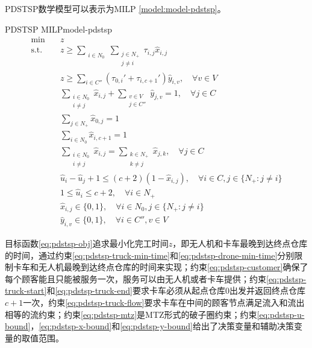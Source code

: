 PDSTSP数学模型可以表示为MILP \ref{model:model-pdstsp}。

{
\newcommand{\mySubstack}[1]{\mathclap{\substack{#1}}}

\begin{model}{PDSTSP MILP}{model-pdstsp}
\begin{align}
    \min \quad & z \label{eq:pdstsp-obj}\\
    \text{s.t.} \quad & z \geq \sum_{\substack{i \in N_0}} \sum_{\substack{j \in N_{+}\\ j\neq i}}\tau_{i,j}\hat{x}_{i,j} \label{eq:pdstsp-truck-min-time}\\
    \quad & z \geq \sum_{i \in C''}(\tau_{0,i}' + \tau_{i, c+1}')\hat{y}_{i,v},\quad \forall v \in V\label{eq:pdstsp-drone-min-time}\\
    \quad & \sum_{\substack{i \in N_0\\ i\neq j}}\hat{x}_{i,j} + \sum_{\substack{v \in V\\ j \in C''}}\hat{y}_{j,v} = 1, \quad \forall j \in C\label{eq:pdstsp-customer}\\
    \quad & \sum_{j \in N_{+}}\hat{x}_{0,j} = 1\label{eq:pdstsp-truck-start}\\
    \quad & \sum_{i \in N_0}\hat{x}_{i,c+1} = 1\label{eq:pdstsp-truck-end}\\
    \quad & \sum_{\substack{i \in N_0\\i \neq j}}\hat{x}_{i,j} = \sum_{\substack{k \in N_{+}\\ k\neq j}}\hat{x}_{j,k}, \quad \forall j \in C\label{eq:pdstsp-truck-flow}\\
    \quad & \hat{u}_i - \hat{u}_j + 1 \leq (c+2)(1 - \hat{x}_{i,j}), \quad \forall i \in C, j \in \{N_{+}:j \neq i\}\label{eq:pdstsp-mtz}\\
    \quad & 1 \leq \hat{u}_i \leq c+2, \quad \forall i \in N_{+}\label{eq:pdstsp-u-bound}\\
    \quad & \hat{x}_{i,j} \in \{0,1\},\quad \forall i \in N_0, j \in \{N_{+}: j\neq i\}\label{eq:pdstsp-x-bound}\\
    \quad & \hat{y}_{i,v} \in \{0,1\},\quad \forall i \in C'', v \in V\label{eq:pdstsp-y-bound}
\end{align}
\end{model}
}

目标函数\ref{eq:pdstsp-obj}追求最小化完工时间$z$，即无人机和卡车最晚到达终点仓库的时间，通过约束\ref{eq:pdstsp-truck-min-time}和\ref{eq:pdstsp-drone-min-time}分别限制卡车和无人机最晚到达终点仓库的时间来实现；约束\ref{eq:pdstsp-customer}确保了每个顾客能且只能被服务一次，服务可以由无人机或者卡车提供；约束\ref{eq:pdstsp-truck-start}和\ref{eq:pdstsp-truck-end}要求卡车必须从起点仓库$0$出发并返回终点仓库$c+1$一次，约束\ref{eq:pdstsp-truck-flow}要求卡车在中间的顾客节点满足流入和流出相等的流约束；约束\ref{eq:pdstsp-mtz}是MTZ形式的破子圈约束；约束\ref{eq:pdstsp-u-bound}，\ref{eq:pdstsp-x-bound}和\ref{eq:pdstsp-y-bound}给出了决策变量和辅助决策变量的取值范围。

